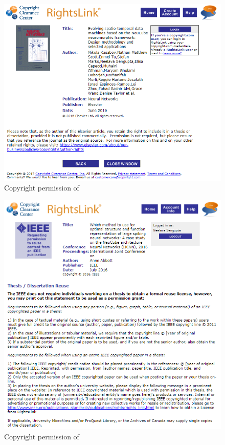 \begin{figure}
	\centering
	\includegraphics[width=0.8\linewidth]{fig/copyrights/neural_networks.PNG}
	\caption{Copyright permission of \citet{kasabov2016evolving}}
\end{figure}

\begin{figure}
	\centering
	\includegraphics[width=0.8\linewidth]{fig/copyrights/ieee_ijcnn.PNG}
	\caption{Copyright permission of \citet{abbott2016method}}
\end{figure}

